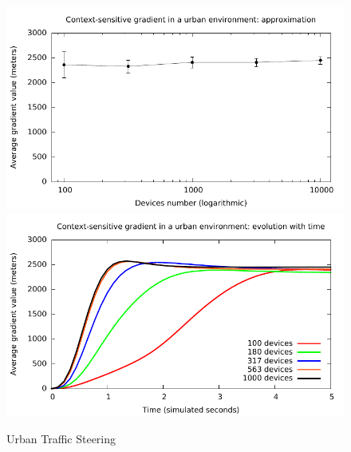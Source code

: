 \documentclass[12pt,a4paper,twoside,openright]{book}
\begin{document}
\begin{figure}
	\centering
	\includegraphics[width=\textwidth]{img/tetc-graphs/l-approx-nosmooth}
	\includegraphics[width=\textwidth]{img/tetc-graphs/l-time}
	\caption{Urban Traffic Steering}
	\label{f:tests-urban}
\end{figure}
\label{f:tests}
\end{document}
